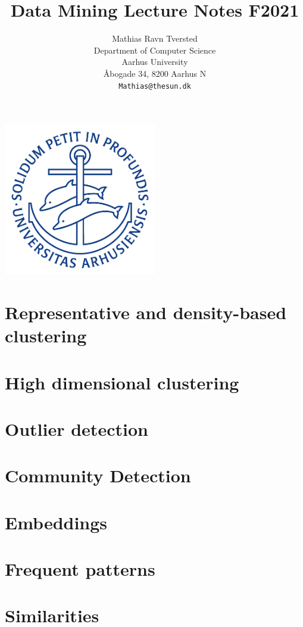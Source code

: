 \documentclass{article}
\title{Data Mining Lecture Notes F2021}
\author{
 Mathias Ravn Tversted \\
  Department of Computer Science\\
  Aarhus University\\
  Åbogade 34, 8200 Aarhus N \\
  \texttt{Mathias@thesun.dk} \\
}
\begin{document}
\maketitle
\begin{center}
    \includegraphics[width=0.5\textwidth]{ausegl_blaa.png}
\end{center}
\newpage
\tableofcontents
\newpage


\section{Representative and density-based clustering}

\newpage
\section{High dimensional clustering}

\newpage
\section{Outlier detection}

\newpage
\section{Community Detection}

\newpage
\section{Embeddings}

\newpage
\section{Frequent patterns}

\newpage
\section{Similarities}

\end{document}
